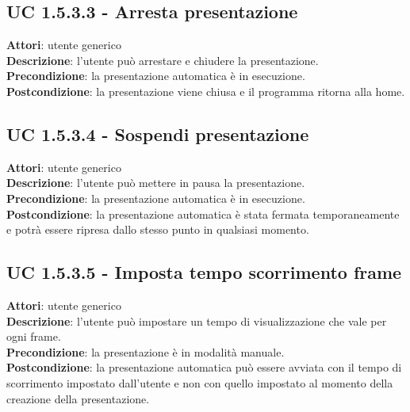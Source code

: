 	\subsection{UC 1.5.3.3 - Arresta presentazione}{
		\label{uc1.5.3.3}
		\textbf{Attori}: utente generico \\
		\textbf{Descrizione}: l'utente può arrestare e chiudere la presentazione. \\
		\textbf{Precondizione}: la presentazione automatica è in esecuzione.	\\
		\textbf{Postcondizione}: la presentazione viene chiusa e il programma ritorna alla home.	\\
	}
	\subsection{UC 1.5.3.4 - Sospendi presentazione}{
		\label{uc1.5.3.4}
		\textbf{Attori}: utente generico \\
		\textbf{Descrizione}: l'utente può mettere in pausa la presentazione. \\
		\textbf{Precondizione}: la presentazione automatica è in esecuzione.	\\
		\textbf{Postcondizione}: la presentazione automatica è stata fermata temporaneamente e potrà essere ripresa dallo stesso punto in qualsiasi momento.	\\
	}
	\subsection{UC 1.5.3.5 - Imposta tempo scorrimento frame}{
		\label{uc1.5.3.5}
		\textbf{Attori}: utente generico \\
		\textbf{Descrizione}: l'utente può impostare un tempo di visualizzazione che vale per ogni frame. \\
		\textbf{Precondizione}: la presentazione è in modalità manuale.	\\
		\textbf{Postcondizione}: la presentazione automatica può essere avviata con il tempo di scorrimento impostato dall'utente e non con quello impostato al momento della creazione della presentazione.	\\
	}
